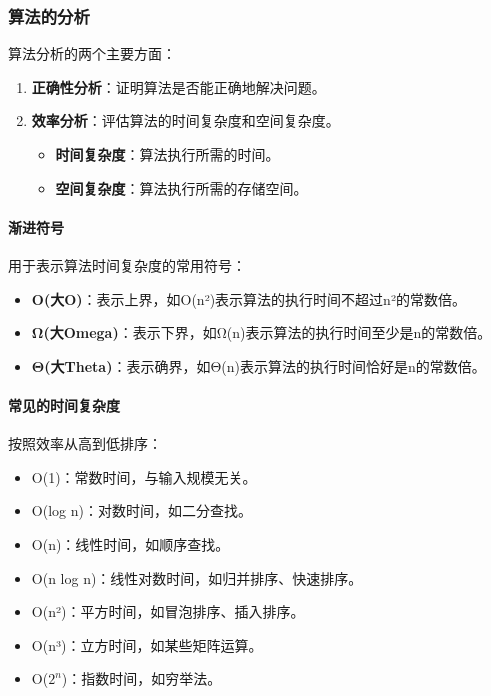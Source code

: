 \documentclass{../../note}
\begin{document}
\subsubsection{算法的分析}
算法分析的两个主要方面：
\begin{enumerate}
  \item \textbf{正确性分析}：证明算法是否能正确地解决问题。
  \item \textbf{效率分析}：评估算法的时间复杂度和空间复杂度。
    \begin{itemize}
      \item \textbf{时间复杂度}：算法执行所需的时间。
      \item \textbf{空间复杂度}：算法执行所需的存储空间。
    \end{itemize}
\end{enumerate}

\paragraph{渐进符号}
用于表示算法时间复杂度的常用符号：
\begin{itemize}
  \item \textbf{O(大O)}：表示上界，如O(n²)表示算法的执行时间不超过n²的常数倍。
  \item \textbf{Ω(大Omega)}：表示下界，如Ω(n)表示算法的执行时间至少是n的常数倍。
  \item \textbf{Θ(大Theta)}：表示确界，如Θ(n)表示算法的执行时间恰好是n的常数倍。
\end{itemize}

\paragraph{常见的时间复杂度}
按照效率从高到低排序：
\begin{itemize}
  \item O(1)：常数时间，与输入规模无关。
  \item O(log n)：对数时间，如二分查找。
  \item O(n)：线性时间，如顺序查找。
  \item O(n log n)：线性对数时间，如归并排序、快速排序。
  \item O(n²)：平方时间，如冒泡排序、插入排序。
  \item O(n³)：立方时间，如某些矩阵运算。
  \item O($2^n$)：指数时间，如穷举法。
\end{itemize}
\end{document}
